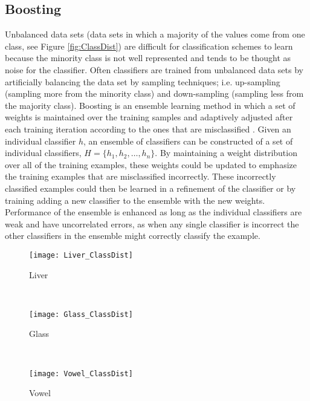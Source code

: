 \subsection{Boosting}
Unbalanced data sets (data sets in which a majority of the values come from one class, see Figure \ref{fig:ClassDist}) are difficult for classification schemes to learn because the minority class is not well represented and tends to be thought as noise for the classifier.
Often classifiers are trained from unbalanced data sets by artificially balancing the data set by sampling techniques; i.e. up-sampling (sampling more from the minority class) and down-sampling (sampling less from the majority class).
Boosting is an ensemble learning method in which a set of weights is maintained over the training samples and adaptively adjusted after each training iteration according to the ones that are misclassified \cite{li_adaboost_2008}.
Given an individual classifier $h$, an ensemble of classifiers can be constructed of a set of individual classifiers, $H=\{h_1, h_2,\dots, h_n\}$.
By maintaining a weight distribution over all of the training examples, these weights could be updated to emphasize the training examples that are misclassified incorrectly.  These incorrectly classified examples could then be learned in a refinement of the classifier or by training adding a new classifier to the ensemble with the new weights.
Performance of the ensemble is enhanced as long as the individual classifiers are weak and have uncorrelated errors, as when any single classifier is incorrect the other classifiers in the ensemble might correctly classify the example.
\begin{figure*}[ht!]
	\centering
	\begin{subfigure}[b]{0.3\textwidth}
		\centering
		\texttt{[image: Liver\_ClassDist]}
        \caption{Liver}
	\end{subfigure}%
	~
	\begin{subfigure}[b]{0.3\textwidth}
		\centering
		\texttt{[image: Glass\_ClassDist]}
        \caption{Glass}
	\end{subfigure}	
    ~
	\begin{subfigure}[b]{0.3\textwidth}
		\centering
		\texttt{[image: Vowel\_ClassDist]}
        \caption{Vowel}
	\end{subfigure}%
	\caption{Distribution of Class Data}
	\label{fig:ClassDist}
\end{figure*}
